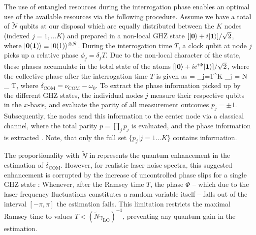 The use of entangled resources 
during
the interrogation phase enables an optimal use of the available resources via
the following procedure.  Assume we have a total of $\tilde N$ 
qubits at
our disposal which are equally distributed between the $K$ nodes (indexed
$j=1,\hdots K$) and prepared in a non-local GHZ state $[| \mathbf{0} \rangle +
i| \mathbf{1} \rangle]/\sqrt{2}$, where $| \mathbf{0 (1)} \rangle\equiv| 0(1) \rangle^{\otimes
\tilde N}$. During the
interrogation time $T$, a clock qubit at node $j$ picks up a relative phase $\phi_j = \delta_j
T$.
Due to the non-local character of the state, these phases accumulate in the total
state of the atoms  $[| \mathbf{0} \rangle + i e^{i\Phi}| \mathbf{1} \rangle]/\sqrt{2}$,
where the collective phase after the interrogation time $T$ is given as
\bel
\label{eq:1}
\Phi = \sum_{j=1}^K  \phi_j =
\tilde N \delta_ T,
\eel
where $\delta_\mathrm{COM} = \nu_\mathrm{COM} - \omega_0$.
To extract the phase information picked up by the different GHZ states, 
the individual nodes $j$ measure their respective
qubits in the $x$-basis, and evaluate the parity of all measurement outcomes
$p_j = \pm 1$.
Subsequently, the nodes send this information to the center node via a classical
channel, where the total parity $p = \prod_{j} p_{j}$ is evaluated, and the
phase information is extracted \cite{Bollinger1996, Leibfried2004}. Note, that
only the full set $\{p_j |j=1\hdots K \}$ contains information. 

The proportionality with $\tilde N$ in  represents the quantum
enhancement in the estimation of $\delta_\mathrm{COM}$. However, for realistic
laser noise spectra, this suggested enhancement is corrupted  by the increase of
uncontrolled phase slips for a single GHZ
state 
\cite{Wineland1998}: Whenever, after the Ramsey time $T$, the phase $\Phi$ --
which due to the laser frequency fluctuations constitutes a random variable itself --
falls out of the interval $[-\pi,\pi]$ the estimation fails. This limitation
restricts the maximal Ramsey time to values $T < (\tilde
N\gamma_\mathrm{LO})^{-1}$, preventing any quantum gain in the estimation.


